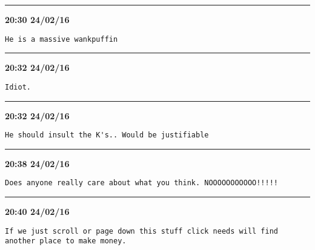 \hrule%

\begin{adjustwidth}{0cm}{0cm}
\footnotesize \textbf{20:30 24/02/16}

\begin{lstlisting}[breaklines, breakatwhitespace, basicstyle=\small, frame=leftline]
He is a massive wankpuffin
\end{lstlisting}
\end{adjustwidth}

\hrule%

\begin{adjustwidth}{0cm}{0cm}
\footnotesize \textbf{20:32 24/02/16}

\begin{lstlisting}[breaklines, breakatwhitespace, basicstyle=\small, frame=leftline]
Idiot.
\end{lstlisting}
\end{adjustwidth}

\hrule%

\begin{adjustwidth}{0cm}{0cm}
\footnotesize \textbf{20:32 24/02/16}

\begin{lstlisting}[breaklines, breakatwhitespace, basicstyle=\small, frame=leftline]
He should insult the K's.. Would be justifiable
\end{lstlisting}
\end{adjustwidth}

\hrule%

\begin{adjustwidth}{0cm}{0cm}
\footnotesize \textbf{20:38 24/02/16}

\begin{lstlisting}[breaklines, breakatwhitespace, basicstyle=\small, frame=leftline]
Does anyone really care about what you think. NOOOOOOOOOOO!!!!!
\end{lstlisting}
\end{adjustwidth}

\hrule%

\begin{adjustwidth}{0cm}{0cm}
\footnotesize \textbf{20:40 24/02/16}

\begin{lstlisting}[breaklines, breakatwhitespace, basicstyle=\small, frame=leftline]
If we just scroll or page down this stuff click needs will find another place to make money.
\end{lstlisting}
\end{adjustwidth}

